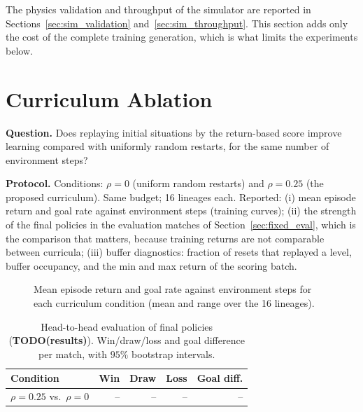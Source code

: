 The physics validation and throughput of the simulator are reported in Sections~\ref{sec:sim_validation} and~\ref{sec:sim_throughput}.  This section adds only the
cost of the complete training generation, which is what limits the experiments below.


\section{Curriculum Ablation}
\label{sec:ablation}

\textbf{Question.} Does replaying initial situations by the return-based score improve learning compared with uniformly random restarts, for the same number of environment steps?

\textbf{Protocol.} Conditions: $\rho = 0$ (uniform random restarts) and $\rho = 0.25$ (the proposed curriculum).  Same budget; 16 lineages each.  Reported: (i) mean episode return and goal rate against environment steps
(training curves); (ii) the strength of the final policies in the evaluation matches of Section~\ref{sec:fixed_eval}, which is the comparison that matters, because training returns are not comparable between curricula;
(iii) buffer diagnostics: fraction of resets that replayed a level, buffer occupancy, and the min and max return of the scoring batch.

\begin{figure}[ht]
    \centering
    \caption{Mean episode return and goal rate against environment steps for each curriculum condition (mean and range over the 16 lineages).}
    \label{fig:ablation_curves}
\end{figure}

\begin{table}[ht]
    \centering
    \caption{Head-to-head evaluation of final policies (\textbf{TODO(results)}).  Win/draw/loss and goal difference per match, with $95\%$ bootstrap intervals.}
    \label{tab:ablation_h2h}
    \small
    \begin{tabular}{lrrrr}
        \toprule
        \textbf{Condition} & \textbf{Win} & \textbf{Draw} & \textbf{Loss} & \textbf{Goal diff.} \\
        \midrule
        $\rho=0.25$ vs.\ $\rho=0$ & -- & -- & -- & -- \\
        \bottomrule
    \end{tabular}
\end{table}

